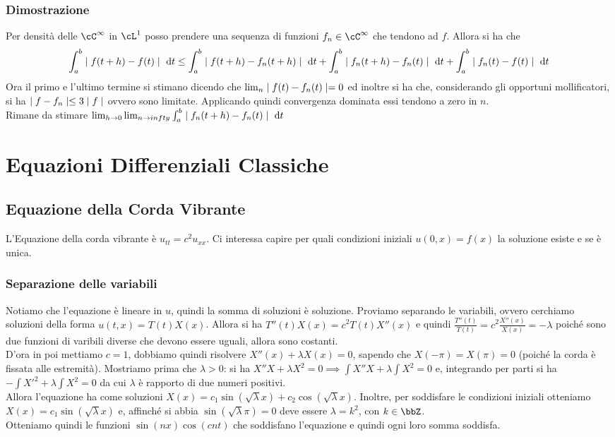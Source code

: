 \documentclass[a4paper,NoNotes,GeneralMath]{stdmdoc}
\begin{document}
	\subsubsection*{Dimostrazione}
	Per densità delle $\cC^\infty$ in $\cL^1$ posso prendere una sequenza di funzioni $f_n \in \cC^\infty$ che tendono ad $f$. Allora si ha che
	$$ \int_a^b \abs{f(t + h) - f(t)} \de t \le \int_a^b \abs{f(t + h) - f_n(t + h)} \de t + \int_a^b \abs{f_n(t + h) - f_n(t)} \de t + \int_a^b \abs{f_n(t) - f(t)} \de t $$
	Ora il primo e l'ultimo termine si stimano dicendo che $\lim_n \mid f(t) - f_n(t) \mid = 0$ ed inoltre si ha che, considerando gli opportuni mollificatori, si ha $\mid f - f_n \mid \le 3 \mid f \mid$ ovvero sono limitate. Applicando quindi convergenza dominata essi tendono a zero in $n$. \\
	Rimane da stimare $\lim_{h \rar 0} \lim_{n \rar infty} \int_a^b \abs{f_n(t + h) - f_n(t)} \de t$
	
	
	\section*{Equazioni Differenziali Classiche}
	\subsection*{Equazione della Corda Vibrante}
	L'Equazione della corda vibrante è $u_{tt} = c^2 u_{xx}$. Ci interessa capire per quali condizioni iniziali $u(0, x) = f(x)$ la soluzione esiste e se è unica. \\
	
	\subsubsection*{Separazione delle variabili}
	Notiamo che l'equazione è lineare in $u$, quindi la somma di soluzioni è soluzione. Proviamo separando le variabili, ovvero cerchiamo soluzioni della forma $u(t, x) = T(t) X(x)$. Allora si ha $T''(t) X(x) = c^2 T(t) X''(x)$ e quindi $\frac{T''(t)}{T(t)} = c^2 \frac{X''(x)}{X(x)} = - \lambda$ poiché sono due funzioni di varibili diverse che devono essere uguali, allora sono costanti. \\
	D'ora in poi mettiamo $c = 1$, dobbiamo quindi risolvere $X''(x) + \lambda X(x) = 0$, sapendo che $X(-\pi) = X(\pi) = 0$ (poiché la corda è fissata alle estremità). Mostriamo prima che $\lambda > 0$: si ha $X'' X + \lambda X^2 = 0 \implies \int X'' X + \lambda \int X^2 = 0$ e, integrando per parti si ha $- \int {X'}^2 + \lambda \int X^2 = 0$ da cui $\lambda$ è rapporto di due numeri positivi. \\
	Allora l'equazione ha come soluzioni $X(x) = c_1 \sin(\sqrt{\lambda} x) + c_2 \cos(\sqrt{\lambda} x)$. Inoltre, per soddisfare le condizioni iniziali otteniamo $X(x) = c_1 \sin(\sqrt{\lambda} x)$ e, affinché si abbia $\sin(\sqrt{\lambda} \pi) = 0$ deve essere $\lambda = k^2$, con $k \in \bbZ$. \\
	Otteniamo quindi le funzioni $\sin(nx)\cos(cnt)$ che soddisfano l'equazione e quindi ogni loro somma soddisfa.
	
\end{document}
